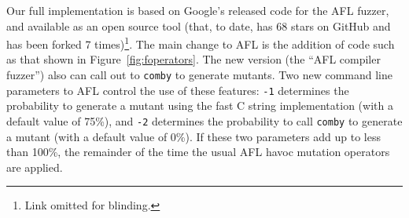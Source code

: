 Our full implementation is based on Google's released code for the AFL
fuzzer, and available as an open source tool (that, to date, has 68
stars on GitHub and has been forked 7 times)\footnote{Link omitted for
  blinding.}.  The main change to AFL is the addition of code such as that shown in
Figure~\ref{fig:foperators}.  The new version (the ``AFL compiler
fuzzer'') also can call out to {\tt comby} to generate mutants.  Two
new command line parameters to AFL control the use of these features:
{\tt -1} determines the probability to generate a mutant using the
fast C string implementation (with a default value of 75\%), and {\tt -2} determines the probability
to call {\tt comby} to generate a mutant (with a default value of
0\%).  If these two parameters add up to less than 100\%, the
remainder of the time the usual AFL havoc mutation operators are applied.